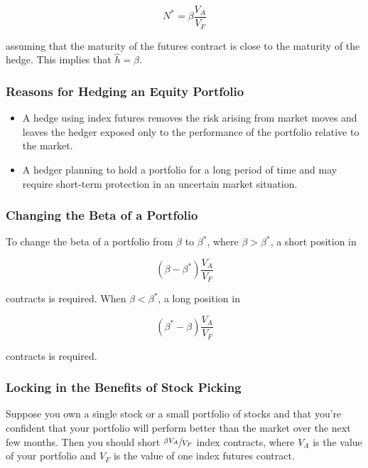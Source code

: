 \begin{equation}
    N^{*}=\beta \frac{V_{A}}{V_{F}}
\end{equation}

assuming that the maturity of the futures contract is close to the maturity
of the hedge. This implies that \(\hat{h}=\beta\).

\subsubsection*{Reasons for Hedging an Equity Portfolio}

\begin{itemize}
    \item A hedge using index futures removes the risk arising from market moves and leaves the hedger exposed only to the performance of the portfolio relative to the market.
    \item A hedger planning to hold a portfolio for a long period of time and may require short-term protection in an uncertain market situation.
\end{itemize}

\subsubsection*{Changing the Beta of a Portfolio}

To change the beta of a portfolio from \(\beta\) to \(\beta^*\), where \(\beta>\beta^*\), a short position in

\begin{equation*}
    (\beta-\beta^*) \frac{V_{A}}{V_{F}}
\end{equation*}

contracts is required. When \(\beta<\beta^*\), a long position in

\begin{equation*}
    (\beta^*-\beta) \frac{V_{A}}{V_{F}}
\end{equation*}

contracts is required.

\subsubsection*{Locking in the Benefits of Stock Picking}

Suppose you own a single stock or a small portfolio of stocks and that you're confident that your portfolio will perform better than the market over the next few months. Then you should short \(\sfrac{\beta V_{A}}{V_{F}}\) index contracts, where \(V_{A}\) is the value of your portfolio and \(V_{F}\) is the value of one index futures contract.

